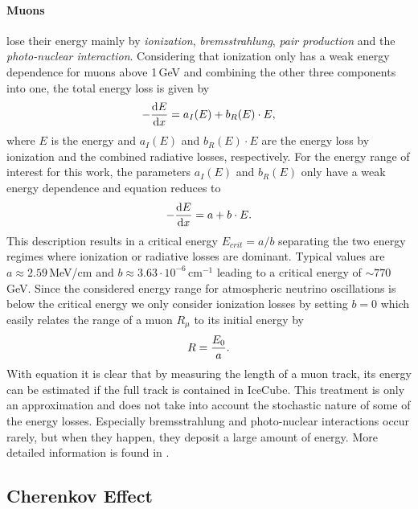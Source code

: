 \paragraph{Muons} lose their energy mainly by \textit{ionization}, \textit{bremsstrahlung}, \textit{pair production} and the \textit{photo-nuclear interaction}.
Considering that ionization only has a weak energy dependence for muons above 1\,GeV and combining the other three components into one, the total energy loss is given by
\begin{equation}
    -\frac{\mathrm{d}E}{\mathrm{d}x} = a_I(E) + b_R(E) \cdot E,
    \labeq{radiative_losses}
\end{equation}
where $E$ is the energy and $a_I(E)$ and $b_R(E) \cdot E$ are the energy loss by ionization and the combined radiative losses, respectively.
For the energy range of interest for this work, the parameters $a_I(E)$ and $b_R(E)$ only have a weak energy dependence and equation  reduces to
\begin{equation}
    -\frac{\mathrm{d}E}{\mathrm{d}x} = a + b \cdot E.
    \labeq{radiative_losses_simple}
\end{equation}
This description results in a critical energy $E_{crit}=a/b$ separating the two energy regimes where ionization or radiative losses are dominant.
Typical values are $a \approx 2.59$\,MeV/cm and $b \approx 3.63 \cdot 10^{-6}$\,cm$^{-1}$ \cite{2004hep.ph....7075C} leading to a critical energy of $\sim 770$\,GeV.
Since the considered energy range for atmospheric neutrino oscillations is below the critical energy we only consider ionization losses by setting $b=0$ which easily relates the range of a muon $R_\mu$ to its initial energy by
\begin{equation}
    R = \frac{E_0}{a}.
    \labeq{muon_range_approx}
\end{equation}
With equation  it is clear that by measuring the length of a muon track, its energy can be estimated if the full track is contained in IceCube.
This treatment is only an approximation and does not take into account the stochastic nature of some of the energy losses.
Especially bremsstrahlung and photo-nuclear interactions occur rarely, but when they happen, they deposit a large amount of energy. More detailed information is found in .


\subsection{Cherenkov Effect} 

